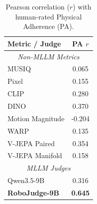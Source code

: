 \begin{table}
\centering
\caption{Pearson correlation ($r$) with human-rated Physical Adherence (PA).}
\label{tab:non_MLLM_baseline}
\fontsize{7.5pt}{8.5pt}\selectfont
\setlength{\tabcolsep}{4pt}
\begin{tabular}{@{}lc@{}}
\toprule
\textbf{Metric / Judge} & \textbf{PA $r$} \\
\midrule
\multicolumn{2}{c}{\textit{Non-MLLM Metrics}} \\
\midrule
MUSIQ & 0.065 \\
Pixel & 0.155 \\
CLIP & 0.280 \\
DINO & 0.370 \\
Motion Magnitude & -0.204 \\
WARP & 0.135 \\
V-JEPA Paired & 0.354 \\
V-JEPA Manifold & 0.158 \\
\midrule
\multicolumn{2}{c}{\textit{MLLM Judges}} \\
\midrule
Qwen3.5-9B & 0.316 \\
\textbf{RoboJudge-9B} & \textbf{0.645} \\
\bottomrule
\end{tabular}
\end{table}
